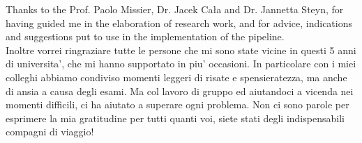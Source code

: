 Thanks to the Prof. Paolo Missier, Dr. Jacek Ca{\l}a and Dr. Jannetta Steyn, for having guided me in the elaboration of research work, and for advice, indications and suggestions put to use in the implementation of the pipeline.
\\[1\baselineskip]
Inoltre vorrei ringraziare tutte le persone che mi sono state vicine in questi 5 anni di universita', che mi hanno supportato in piu' occasioni.\newline
In particolare con i miei colleghi abbiamo condiviso momenti leggeri di risate e spensieratezza, ma anche di ansia a causa degli esami. Ma col lavoro di gruppo ed aiutandoci a vicenda nei momenti difficili, ci ha aiutato a superare ogni problema.\newline
Non ci sono parole per esprimere la mia gratitudine per tutti quanti voi, siete stati degli indispensabili compagni di viaggio!